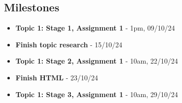 \documentclass{article}
\begin{document}
\subsection{Milestones}
    \begin{itemize}
        \item \textbf{Topic 1: Stage 1, Assignment 1} - 1pm, 09/10/24
        \item \textbf{Finish topic research} - 15/10/24
        \item \textbf{Topic 1: Stage 2, Assignment 1} - 10am, 22/10/24
        \item \textbf{Finish HTML} - 23/10/24
        \item \textbf{Topic 1: Stage 3, Assignment 1} - 10am, 29/10/24
    \end{itemize}
\end{document}
